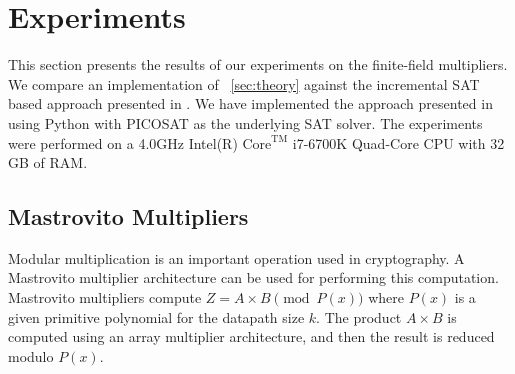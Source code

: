 \section{Experiments}
\label{sec:exp}

This section presents the results of our experiments on the finite-field multipliers.
We compare an implementation of ~\ref{sec:theory}  
against the incremental SAT based approach presented in \cite{fujita:2015}.
We have implemented the approach presented in \cite{fujita:2015} using
Python with PICOSAT as the underlying SAT solver. The experiments were performed on a 4.0GHz 
Intel(R) $\text{Core}^{\text{TM}}$ i7-6700K Quad-Core CPU with 32 GB of RAM.
\subsection{Mastrovito Multipliers}
Modular multiplication is an important operation used in cryptography. 
A Mastrovito multiplier architecture can be used for performing this computation.
Mastrovito multipliers compute $Z = A\times B \pmod{P(x)}$ where $P(x)$ is a given primitive polynomial for the datapath size
$k$. The product $A \times B$ is computed using an array multiplier architecture, and then the result is reduced modulo $P(x)$.
